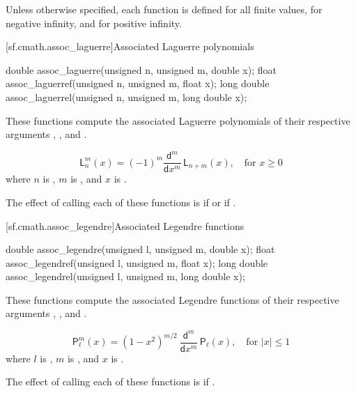 \pnum
Unless otherwise specified,
each function is defined
for all finite values,
for negative infinity,
and for positive infinity.

[sf.cmath.assoc_laguerre]{Associated Laguerre polynomials}%
%
%
%
%
%
\begin{itemdecl}
double       assoc_laguerre(unsigned n, unsigned m, double x);
float        assoc_laguerref(unsigned n, unsigned m, float x);
long double  assoc_laguerrel(unsigned n, unsigned m, long double x);
\end{itemdecl}

\begin{itemdescr}
\pnum\effects
These functions compute
the associated Laguerre polynomials
of their respective arguments
, , and .

\pnum\returns
\[%
  \mathsf{L}_n^m(x) =
  (-1)^m \frac{\mathsf{d} ^ m}
	   {\mathsf{d}x ^ m} \, \mathsf{L}_{n+m}(x),
	   \quad \mbox{for $x \ge 0$}
\]
where
$n$ is ,
$m$ is , and
$x$ is .

\pnum\remarks
The effect of calling each of these functions
is 
if  or if .
\end{itemdescr}

[sf.cmath.assoc_legendre]{Associated Legendre functions}%
%
%
%
%
%
\begin{itemdecl}
double       assoc_legendre(unsigned l, unsigned m, double x);
float        assoc_legendref(unsigned l, unsigned m, float x);
long double  assoc_legendrel(unsigned l, unsigned m, long double x);
\end{itemdecl}

\begin{itemdescr}

\pnum\effects
These functions compute
the associated Legendre functions
of their respective arguments
, , and .

\pnum\returns
\[%
  \mathsf{P}_\ell^m(x) =
  (1 - x^2) ^ {m/2}
  \:
  \frac{ \mathsf{d} ^ m}
       { \mathsf{d}x ^ m} \, \mathsf{P}_\ell(x),
	   \quad \mbox{for $|x| \le 1$}
\]
where
$l$ is ,
$m$ is , and
$x$ is .

\pnum\remarks
The effect of calling each of these functions
is 
if .
\end{itemdescr}

